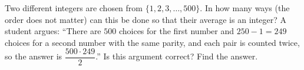 Two different integers are chosen from $\{1,2,3,\dots,500\}$. In how many ways (the order does not matter) can this be done so that their average is an integer? A student argues: ``There are $500$ choices for the first number and $250-1=249$ choices for a second number with the same parity, and each pair is counted twice, so the answer is $\dfrac{500\cdot249}{2}$.'' Is this argument correct? Find the answer.
